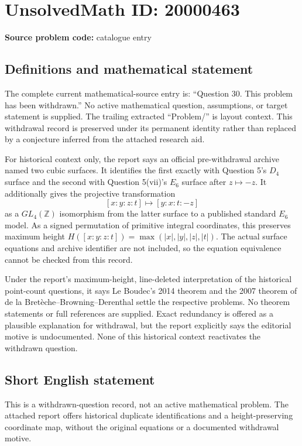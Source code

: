 \documentclass[11pt]{article}
\newcommand{\Z}{\mathbb{Z}}
\begin{document}
\section*{UnsolvedMath ID: 20000463}
\textbf{Source problem code:} catalogue entry
\subsection{Definitions and mathematical statement}
The complete current mathematical-source entry is: ``Question 30. This problem has been withdrawn.'' No active mathematical question, assumptions, or target statement is supplied. The trailing extracted ``Problem/'' is layout context. This withdrawal record is preserved under its permanent identity rather than replaced by a conjecture inferred from the attached research aid.

For historical context only, the report says an official pre-withdrawal archive named two cubic surfaces. It identifies the first exactly with Question 5's \(D_4\) surface and the second with Question 5(vii)'s \(E_6\) surface after \(z\mapsto-z\). It additionally gives the projective transformation
\[
[x:y:z:t]\longmapsto[y:x:t:-z]
\]
as a \(GL_4(\Z)\) isomorphism from the latter surface to a published standard \(E_6\) model. As a signed permutation of primitive integral coordinates, this preserves maximum height \(H([x:y:z:t])=\max(|x|,|y|,|z|,|t|)\). The actual surface equations and archive identifier are not included, so the equation equivalence cannot be checked from this record.

Under the report's maximum-height, line-deleted interpretation of the historical point-count questions, it says Le Boudec's 2014 theorem and the 2007 theorem of de la Bret\`eche--Browning--Derenthal settle the respective problems. No theorem statements or full references are supplied. Exact redundancy is offered as a plausible explanation for withdrawal, but the report explicitly says the editorial motive is undocumented. None of this historical context reactivates the withdrawn question.
\subsection{Short English statement}
This is a withdrawn-question record, not an active mathematical problem. The attached report offers historical duplicate identifications and a height-preserving coordinate map, without the original equations or a documented withdrawal motive.
\end{document}

